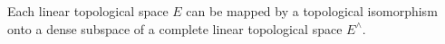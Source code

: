 Each linear topological space $E$ can be mapped by a topological isomorphism onto a dense subspace of a complete linear topological space $E^\wedge$.
